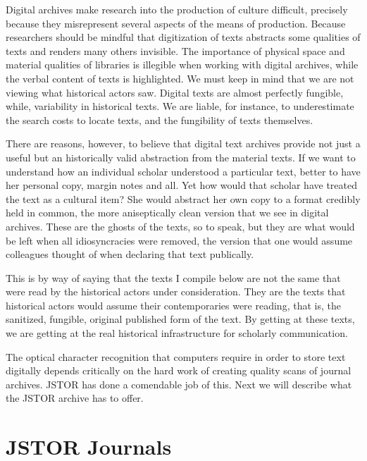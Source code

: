 \documentclass[]{book}
\begin{document}
Digital archives make research into the production of culture difficult,
precisely because they misrepresent several aspects of the means of
production. Because researchers should be mindful that digitization of
texts abstracts some qualities of texts and renders many others
invisible. The importance of physical space and material qualities of
libraries is illegible when working with digital archives, while the
verbal content of texts is highlighted. We must keep in mind that we are
not viewing what historical actors saw. Digital texts are almost
perfectly fungible, while, variability in historical texts. We are
liable, for instance, to underestimate the search costs to locate texts,
and the fungibility of texts themselves.

There are reasons, however, to believe that digital text archives
provide not just a useful but an historically valid abstraction from the
material texts. If we want to understand how an individual scholar
understood a particular text, better to have her personal copy, margin
notes and all. Yet how would that scholar have treated the text as a
cultural item? She would abstract her own copy to a format credibly held
in common, the more aniseptically clean version that we see in digital
archives. These are the ghosts of the texts, so to speak, but they are
what would be left when all idiosyncracies were removed, the version
that one would assume colleagues thought of when declaring that text
publically.

This is by way of saying that the texts I compile below are not the same
that were read by the historical actors under consideration. They are
the texts that historical actors would assume their contemporaries were
reading, that is, the sanitized, fungible, original published form of
the text. By getting at these texts, we are getting at the real
historical infrastructure for scholarly communication.

The optical character recognition that computers require in order to
store text digitally depends critically on the hard work of creating
quality scans of journal archives. JSTOR has done a comendable job of
this. Next we will describe what the JSTOR archive has to offer.

\section{JSTOR Journals}\label{kd-dq1}
\end{document}
